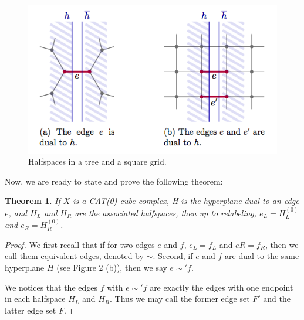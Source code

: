 \documentclass[12pt, a4paper]{article}
\theoremstyle{plain}
\newtheorem{theorem}{Theorem}[section]
\theoremstyle{definition}
\newtheorem{definition}[theorem]{Definition}
\theoremstyle{remark}
\begin{document}
    
    \begin{figure}[H]
        \centering
        \includegraphics[width=0.6\linewidth]{halfspaces}
        \caption{Halfspaces in a tree and a square grid. \cite{loeh}}
    \end{figure}
    
    Now, we are ready to state and prove the following theorem:
    
    \begin{theorem}
        If $X$ is a CAT(0) cube complex, H is the hyperplane dual to an edge $e$, and $H_{L}$ and $H_{R}$ are the associated halfspaces, then up to relabeling, $e_{L} = H_{L}^{(0)}$ and $e_{R} = H_{R}^{(0)}$.
    \end{theorem}
    
    \begin{proof}
        We first recall that if for two edges $e$ and $f$, $e_{L} = f_{L}$ and $e{R} = f_{R}$, then we call them equivalent edges, denoted by $\sim$. Second, if $e$ and $f$ are dual to the same hyperplane $H$ (see Figure 2 (b)), then we say $e \sim' f$.
        
        We notices that the edges $f$ with $e \sim' f$ are exactly the edges with one endpoint in each halfspace $H_{L}$ and $H_{R}$. Thus we may call the former edge set $F'$ and the latter edge set $F$.
        
        
    \end{proof}
    
    \nocite{*}
    
    
    
\end{document}
